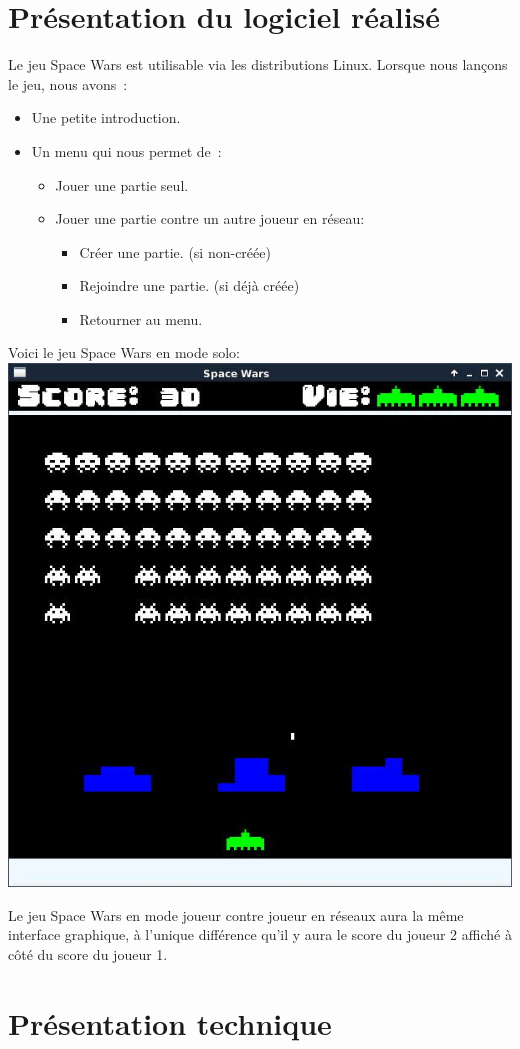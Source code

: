 \documentclass[french, 11pt]{report}
\begin{document}
	\section{Présentation du logiciel réalisé}
	Le jeu Space Wars est utilisable via les distributions Linux.
	Lorsque nous lançons le jeu, nous avons~:
	\begin{itemize}
		\item Une petite introduction.
		\item Un menu qui nous permet de~:
		\begin{itemize}
			\item Jouer une partie seul.
			\item Jouer une partie contre un autre joueur en réseau:
			\begin{itemize}
				\item Créer une partie. (si non-créée)
				\item Rejoindre une partie. (si déjà créée)
				\item Retourner au menu.
			\end{itemize}
		\end{itemize}
	\end{itemize}
	\begin{center}
		Voici le jeu Space Wars en mode solo: \\
		\includegraphics[width=0.55\linewidth]{JeuRealise}
	\end{center}
	Le jeu Space Wars en mode joueur contre joueur en réseaux aura la même interface graphique, à l'unique différence qu'il y aura le score du joueur 2 affiché à côté du score du joueur 1.

	\section{Présentation technique}
\end{document}
